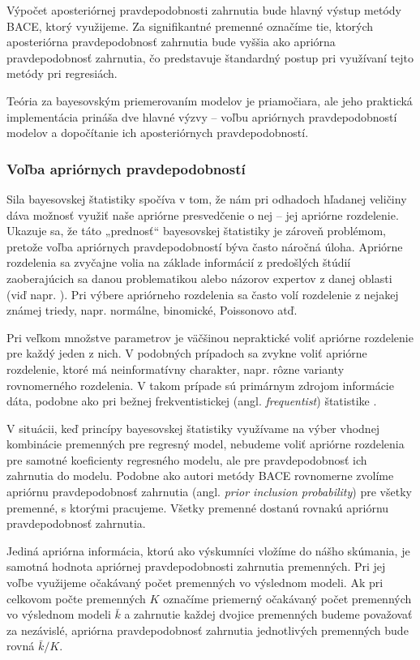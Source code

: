 Výpočet aposteriórnej pravdepodobnosti zahrnutia bude hlavný výstup metódy BACE, ktorý využijeme.
Za signifikantné premenné označíme tie, ktorých aposteriórna pravdepodobnosť zahrnutia bude vyššia ako apriórna pravdepodobnosť zahrnutia, čo predstavuje štandardný postup pri využívaní tejto metódy pri regresiách.

Teória za bayesovským priemerovaním modelov je priamočiara,
ale jeho praktická implementácia prináša dve hlavné výzvy – voľbu apriórnych pravdepodobností modelov a dopočítanie ich aposteriórnych pravdepodobností.

\subsubsection{Voľba apriórnych pravdepodobností}

Sila bayesovskej štatistiky spočíva v tom, že nám pri odhadoch hľadanej veličiny dáva možnosť využiť naše apriórne presvedčenie o nej – jej apriórne rozdelenie.
Ukazuje sa, že táto „prednosť“ bayesovskej štatistiky je zároveň problémom, pretože voľba apriórnych pravdepodobností býva často náročná úloha.
Apriórne rozdelenia sa zvyčajne volia na základe informácií z predošlých štúdií zaoberajúcich sa danou problematikou alebo názorov expertov z danej oblasti (viď napr. \cite{carlin}).
Pri výbere apriórneho rozdelenia sa často volí rozdelenie z nejakej známej triedy, napr. normálne, binomické, Poissonovo atď.

Pri veľkom množstve parametrov je väčšinou nepraktické voliť apriórne rozdelenie pre každý jeden z nich.
V podobných prípadoch sa zvykne voliť apriórne rozdelenie, ktoré má neinformatívny charakter, napr. rôzne varianty rovnomerného rozdelenia.
V takom prípade sú primárnym zdrojom informácie dáta, podobne ako pri bežnej frekventistickej (angl. \emph{frequentist}) štatistike \cite{tiao}.

V situácii, keď princípy bayesovskej štatistiky využívame na výber vhodnej kombinácie premenných pre regresný model,
nebudeme voliť apriórne rozdelenia pre samotné koeficienty regresného modelu, ale pre pravdepodobnosť ich zahrnutia do modelu.
Podobne ako autori metódy BACE rovnomerne zvolíme apriórnu pravdepodobnosť zahrnutia (angl. \emph{prior inclusion probability}) pre všetky premenné,
s ktorými pracujeme. Všetky premenné dostanú rovnakú apriórnu pravdepodobnosť zahrnutia.

Jediná apriórna informácia, ktorú ako výskumníci vložíme do nášho skúmania,
je samotná hodnota apriórnej pravdepodobnosti zahrnutia premenných.
Pri jej voľbe využijeme očakávaný počet premenných vo výslednom modeli.
Ak pri celkovom počte premenných \(K\) označíme priemerný očakávaný počet premenných vo výslednom modeli \(\bar{k}\) a zahrnutie každej dvojice premenných budeme považovať za nezávislé,
apriórna pravdepodobnosť zahrnutia jednotlivých premenných bude rovná \(\bar{k}/K\).


